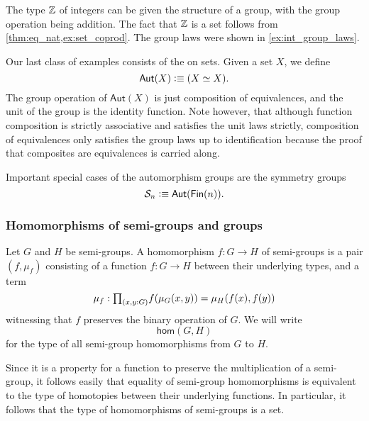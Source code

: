 \begin{eg}
  The type ${\mathbb{Z}}$ of integers can be given the structure of a group, with the group operation being addition. The fact that ${\mathbb{Z}}$ is a set follows from \cref{thm:eq_nat,ex:set_coprod}. The group laws were shown in \cref{ex:int_group_laws}. 
\end{eg}

\begin{eg}
  Our last class of examples consists of the  on sets. Given a set $X$, we define
  \begin{equation*}
    \mathsf{Aut}(X)\vcentcolon\equiv (X\simeq X).
  \end{equation*}
  The group operation of $\mathsf{Aut}(X)$ is just composition of equivalences, and the unit of the group is the identity function. Note however, that although function composition is strictly associative and satisfies the unit laws strictly, composition of equivalences only satisfies the group laws up to identification because the proof that composites are equivalences is carried along.

  Important special cases of the automorphism groups are the symmetry groups
  \begin{equation*}
    \mathcal{S}_n\vcentcolon\equiv \mathsf{Aut}(\mathsf{Fin}(n)).
  \end{equation*}
\end{eg}

\subsubsection{Homomorphisms of semi-groups and groups}

\begin{defn}
  Let $G$ and $H$ be semi-groups. A homomorphism $f:G\to H$ of semi-groups is a pair $(f,\mu_f)$ consisting of a function $f:G\to H$ between their underlying types, and a term
  \begin{equation*}
    \mu_f:\prd{x,y:G} f(\mu_G(x,y))=\mu_H(f(x),f(y))
  \end{equation*}
  witnessing that $f$ preserves the binary operation of $G$. We will write
  \begin{equation*}
    \mathsf{hom}(G,H)
  \end{equation*}
  for the type of all semi-group homomorphisms from $G$ to $H$.
\end{defn}

\begin{rmk}\label{rmk:is-set-hom-semi-group}
  Since it is a property for a function to preserve the multiplication of a semi-group, it follows easily that equality of semi-group homomorphisms is equivalent to the type of homotopies between their underlying functions. In particular, it follows that the type of homomorphisms of semi-groups is a set.
\end{rmk}


